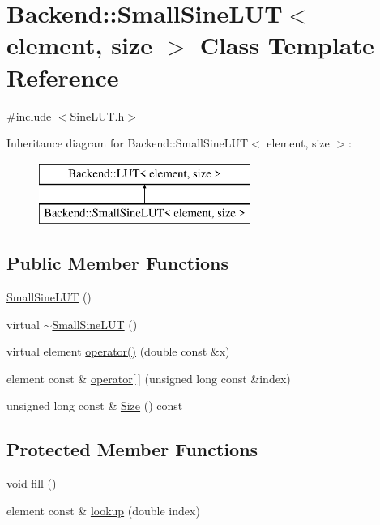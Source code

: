 \hypertarget{class_backend_1_1_small_sine_l_u_t}{\section{Backend\+:\+:Small\+Sine\+L\+U\+T$<$ element, size $>$ Class Template Reference}
\label{class_backend_1_1_small_sine_l_u_t}
}


{\ttfamily \#include $<$Sine\+L\+U\+T.\+h$>$}

Inheritance diagram for Backend\+:\+:Small\+Sine\+L\+U\+T$<$ element, size $>$\+:\begin{figure}[H]
\begin{center}
\leavevmode
\includegraphics[height=2.000000cm]{class_backend_1_1_small_sine_l_u_t}
\end{center}
\end{figure}
\subsection*{Public Member Functions}
\begin{DoxyCompactItemize}
\item 
\hyperlink{class_backend_1_1_small_sine_l_u_t_aa89687103cd20a258e5623ace804bf09}{Small\+Sine\+L\+U\+T} ()
\item 
virtual \hyperlink{class_backend_1_1_small_sine_l_u_t_a75767a2ebad8a8c4d8a4a54b7c61bb0e}{$\sim$\+Small\+Sine\+L\+U\+T} ()
\item 
virtual element \hyperlink{class_backend_1_1_small_sine_l_u_t_a2b6fdef4f825da7555ca4002f1dd94af}{operator()} (double const \&x)
\item 
element const \& \hyperlink{class_backend_1_1_l_u_t_a9a7c75f36c72778098a091db3269c29c}{operator\mbox{[}$\,$\mbox{]}} (unsigned long const \&index)
\item 
unsigned long const \& \hyperlink{class_backend_1_1_l_u_t_a3ab84f04569e89cd6046da599c6edbae}{Size} () const 
\end{DoxyCompactItemize}
\subsection*{Protected Member Functions}
\begin{DoxyCompactItemize}
\item 
void \hyperlink{class_backend_1_1_small_sine_l_u_t_a981ef95660709f9a796dc176e4c66cf3}{fill} ()
\item 
element const \& \hyperlink{class_backend_1_1_small_sine_l_u_t_ab4403a4852d61cef8199a3f2cb313c57}{lookup} (double index)
\end{DoxyCompactItemize}
